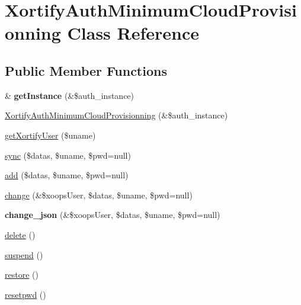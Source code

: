 \hypertarget{class_xortify_auth_minimum_cloud_provisionning}{\section{Xortify\-Auth\-Minimum\-Cloud\-Provisionning Class Reference}
\label{class_xortify_auth_minimum_cloud_provisionning}
}
\subsection*{Public Member Functions}
\begin{DoxyCompactItemize}
\item 
\hypertarget{class_xortify_auth_minimum_cloud_provisionning_a5ffe685ec6feb654b957bc09236212ab}{\& {\bfseries get\-Instance} (\&\$auth\-\_\-instance)}\label{class_xortify_auth_minimum_cloud_provisionning_a5ffe685ec6feb654b957bc09236212ab}

\item 
\hyperlink{class_xortify_auth_minimum_cloud_provisionning_af4d33f9d86481e9611d94bbbcabfd1f4}{Xortify\-Auth\-Minimum\-Cloud\-Provisionning} (\&\$auth\-\_\-instance)
\item 
\hyperlink{class_xortify_auth_minimum_cloud_provisionning_a1ef68232b7cb13178d95ab4c7724f1cf}{get\-Xortify\-User} (\$uname)
\item 
\hyperlink{class_xortify_auth_minimum_cloud_provisionning_ad5f6de069ec2c941209372b5439542d8}{sync} (\$datas, \$uname, \$pwd=null)
\item 
\hyperlink{class_xortify_auth_minimum_cloud_provisionning_a99297f022e9b0789683d69cd6938d7e9}{add} (\$datas, \$uname, \$pwd=null)
\item 
\hyperlink{class_xortify_auth_minimum_cloud_provisionning_ac23f05c27b8c7e64e000c0584ee8568f}{change} (\&\$xoops\-User, \$datas, \$uname, \$pwd=null)
\item 
\hypertarget{class_xortify_auth_minimum_cloud_provisionning_a64f228ca8332d43e76bbbf3e4cfb7aa9}{{\bfseries change\-\_\-json} (\&\$xoops\-User, \$datas, \$uname, \$pwd=null)}\label{class_xortify_auth_minimum_cloud_provisionning_a64f228ca8332d43e76bbbf3e4cfb7aa9}

\item 
\hyperlink{class_xortify_auth_minimum_cloud_provisionning_a2b16743033d5f7a34214f89d7c9b82c6}{delete} ()
\item 
\hyperlink{class_xortify_auth_minimum_cloud_provisionning_a4bfd5c5d10568284236f16f0cf49b9b0}{suspend} ()
\item 
\hyperlink{class_xortify_auth_minimum_cloud_provisionning_a99ea7af9cb2fd541767798130f3e40df}{restore} ()
\item 
\hyperlink{class_xortify_auth_minimum_cloud_provisionning_a3a35fc97f6c383fd973671e7a914a478}{resetpwd} ()
\end{DoxyCompactItemize}
